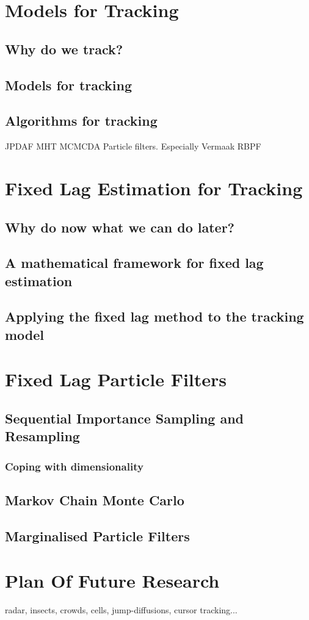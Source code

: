 \documentclass{RJWThesis}
\begin{document}
\chapter{Models for Tracking}

\section{Why do we track?}


\section{Models for tracking}


\section{Algorithms for tracking}
JPDAF
MHT
MCMCDA
Particle filters. Especially Vermaak
RBPF




\chapter{Fixed Lag Estimation for Tracking}
\section{Why do now what we can do later?}


\section{A mathematical framework for fixed lag estimation}


\section{Applying the fixed lag method to the tracking model}





\chapter{Fixed Lag Particle Filters}
\section{Sequential Importance Sampling and Resampling}
\subsection{Coping with dimensionality}
\section{Markov Chain Monte Carlo}
\section{Marginalised Particle Filters}




\chapter{Plan Of Future Research}
radar, insects, crowds, cells, jump-diffusions, cursor tracking...





\end{document}
